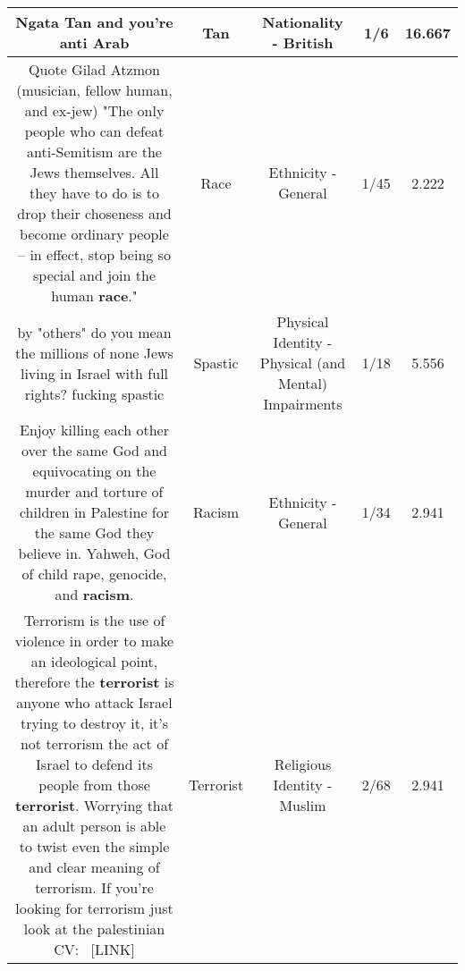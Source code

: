 \documentclass[11pt]{article}
\newlength\mylength
\begin{document}
\begin{center}
\begin{longtable}{|C{.65\mylength}|C{.30\mylength}|C{.12\mylength}|C{.12\mylength}|C{.12\mylength}|}
  \small Ngata \textbf{Tan} and you're anti Arab\normalsize   & Tan & Nationality - British & 1/6 & 16.667 \\  \hline
  \small Quote Gilad Atzmon (musician, fellow human, and ex-jew) "The only people who can defeat anti-Semitism are the Jews themselves. All they have to do is to drop their choseness and become ordinary people – in effect, stop being so special and join the human \textbf{race}."\normalsize   & Race & Ethnicity - General & 1/45 & 2.222 \\  \hline
  \small by "others" do you mean the millions of none Jews living in Israel with full rights? fucking spastic\normalsize   & Spastic & Physical Identity - Physical (and Mental) Impairments & 1/18 & 5.556 \\  \hline
  \small Enjoy killing each other over the same God and equivocating on the murder and torture of children in Palestine for the same God they believe in. Yahweh, God of child rape, genocide, and \textbf{racism}.\normalsize   & Racism & Ethnicity - General & 1/34 & 2.941 \\  \hline
  \small Terrorism is the use of violence in order to make an ideological point, therefore the \textbf{terrorist} is anyone who attack Israel trying to destroy it, it's not terrorism the act of Israel to defend its people from those \textbf{terrorist}. Worrying that an adult person is able to twist even the simple and clear meaning of terrorism. If you're looking for terrorism just look at the palestinian CV:  [LINK] \normalsize   & Terrorist & Religious Identity - Muslim & 2/68 & 2.941 \\  \hline

\end{longtable}
\end{center}
\end{document}
